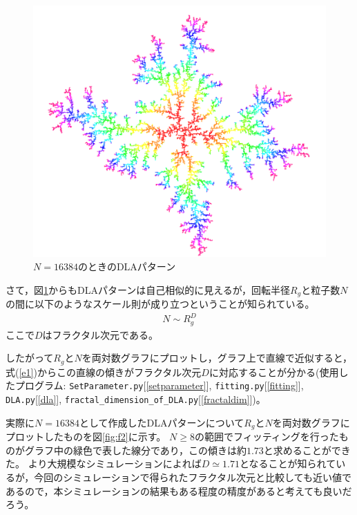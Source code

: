 \documentclass{jsarticle}
\theoremstyle{definition}
\begin{document}
\begin{figure}[H]
  \begin{center}
    \includegraphics[width=\textwidth]{../img/screen_001.pdf}
    \caption{$N=16384$のときのDLAパターン}
    \label{fig:f1}
  \end{center}
\end{figure}

さて，図\ref{fig:f1}からもDLAパターンは自己相似的に見えるが，回転半径$R_{g}$と粒子数$N$の間に以下のようなスケール則が成り立つということが知られている。
\begin{eqnarray}
  N \sim R_{g}^{D}\label{e1}
\end{eqnarray}ここで$D$はフラクタル次元である。

したがって$R_{g}$と$N$を両対数グラフにプロットし，グラフ上で直線で近似すると，式(\ref{e1})からこの直線の傾きがフラクタル次元$D$に対応することが分かる(使用したプログラム: \texttt{SetParameter.py}[\ref{setparameter}], \texttt{fitting.py}[\ref{fitting}], \texttt{DLA.py}[\ref{dla}], \texttt{fractal\_dimension\_of\_DLA.py}[\ref{fractaldim}])。

実際に$N=16384$として作成したDLAパターンについて$R_{g}$と$N$を両対数グラフにプロットしたものを図\ref{fig:f2}に示す。
$N \ge 8$の範囲でフィッティングを行ったものがグラフ中の緑色で表した線分であり，この傾きは約$1.73$と求めることができた。
より大規模なシミュレーションによれば$D \simeq 1.71$となることが知られているが，今回のシミュレーションで得られたフラクタル次元と比較しても近い値であるので，本シミュレーションの結果もある程度の精度があると考えても良いだろう。
\end{document}

